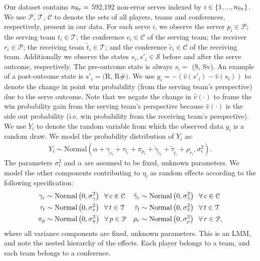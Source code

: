\documentclass[USenglish]{article}
\theoremstyle{dgthm}
\theoremstyle{dgdef}
\begin{document}
Our dataset contains $n_{\mbox{\scriptsize Sv}} =$ 592,192 non-error serves indexed by $i \in \{1, ..., n_{\mbox{\scriptsize Sv}}\}$. We use $\mathcal{P}$, $\mathcal{T}$, $\mathcal{C}$ to denote the sets of all players, teams and conferences, respectively, present in our data. For each serve $i$, we observe the server $p_i \in \mathcal{P}$; the serving team $t_i \in \mathcal{T}$; the conference $c_i \in \mathcal{C}$ of the serving team; the receiver $r_i \in \mathcal{P}$; the receiving team $\tilde t_i \in \mathcal{T}$; and the conference $\tilde c_i \in \mathcal{C}$ of the receiving team. Additionally we observe the states $s_i, s'_i \in \mathcal{S}$ before and after the serve outcome, respectively. The pre-outcome state is always $s_i =$ (S, Sv). An example of a post-outcome state is $s'_i = \mbox{(R, R\#)}$. We use $y_i = -(\hat v(s'_i) - \hat v(s_i))$ to denote the change in point win probability (from the serving team's perspective) due to the serve outcome. Note that we negate the change in $\hat v(\cdot)$ to frame the win probability gain from the serving team's perspective because $\hat v(\cdot)$ is the side out probability (i.e. win probability from the receiving team's perspective). We use $Y_i$ to denote the random variable from which the observed data $y_i$ is a random draw. We model the probability distribution of $Y_i$ as:
\begin{align}
  \label{eqn:serve-model}
  Y_i \sim \mbox{Normal}(\alpha + \gamma_{c_i} + \tau_{t_i} + \pi_{p_i} + \tilde\gamma_{\tilde c_i} + \tilde\tau_{\tilde t_i} + \rho_{r_i}, \sigma^2_\epsilon).
\end{align}
The parameters $\sigma^2_\epsilon$ and $\alpha$ are assumed to be fixed, unknown parameters. We model the other components contributing to $\eta_i$ as random effects according to the following specification:
\begin{align*}
  \gamma_c &\sim \mbox{Normal}\left(0, \sigma^2_\gamma\right) \hspace{2mm} \forall\, c \in \mathcal{C} &
  \tilde\gamma_c &\sim \mbox{Normal}\left(0, \sigma^2_{\tilde\gamma}\right) \hspace{2mm} \forall\, c \in \mathcal{C} \\
  \tau_t &\sim \mbox{Normal}\left(0, \sigma^2_\tau\right) \hspace{2mm} \forall\, t \in \mathcal{T} &
  \tilde\tau_t &\sim \mbox{Normal}\left(0, \sigma^2_{\tilde\tau}\right) \hspace{2mm} \forall\, t \in \mathcal{T} \\
  \pi_p &\sim \mbox{Normal}\left(0, \sigma^2_\pi\right) \hspace{2mm} \forall\, p \in \mathcal{P} &
  \rho_r &\sim \mbox{Normal}\left(0, \sigma^2_\rho\right) \hspace{2mm} \forall\, r \in \mathcal{P},
\end{align*}
where all variance components are fixed, unknown parameters. This is an LMM, and note the nested hierarchy of the effects. Each player belongs to a team, and each team belongs to a conference.
\end{document}
